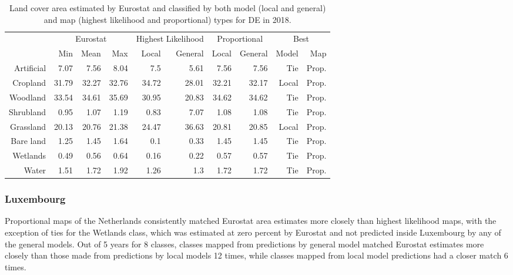     \begin{table}[H]
    \centering
    \caption{Land cover area estimated by Eurostat and classified by both model (local and general) and map (highest likelihood and proportional) types for DE in 2018.}
    
    \begin{tabular}{r|rrr|rr|rr|rr}
    \toprule
    {} & \multicolumn{3}{|c}{Eurostat} & \multicolumn{2}{|c}{Highest Likelihood} & \multicolumn{2}{|c}{Proportional} & \multicolumn{2}{|c}{Best} \\
    {} &      Min &   Mean &    Max &              Local & General &        Local & General &  Model &    Map \\
    \midrule
    Artificial &     7.07 &   7.56 &   8.04 &                7.5 &    5.61 &         7.56 &    7.56 &    Tie &  Prop. \\
    Cropland   &    31.79 &  32.27 &  32.76 &              34.72 &   28.01 &        32.21 &   32.17 &  Local &  Prop. \\
    Woodland   &    33.54 &  34.61 &  35.69 &              30.95 &   20.83 &        34.62 &   34.62 &    Tie &  Prop. \\
    Shrubland  &     0.95 &   1.07 &   1.19 &               0.83 &    7.07 &         1.08 &    1.08 &    Tie &  Prop. \\
    Grassland  &    20.13 &  20.76 &  21.38 &              24.47 &   36.63 &        20.81 &   20.85 &  Local &  Prop. \\
    Bare land  &     1.25 &   1.45 &   1.64 &                0.1 &    0.33 &         1.45 &    1.45 &    Tie &  Prop. \\
    Wetlands   &     0.49 &   0.56 &   0.64 &               0.16 &    0.22 &         0.57 &    0.57 &    Tie &  Prop. \\
    Water      &     1.51 &   1.72 &   1.92 &               1.26 &     1.3 &         1.72 &    1.72 &    Tie &  Prop. \\
    \bottomrule
    \end{tabular}
    \end{table}
    
    \subsubsection{Luxembourg}
    Proportional maps of the Netherlands consistently matched Eurostat area estimates more closely than highest likelihood maps, with the exception of ties for the Wetlands class, which was estimated at zero percent by Eurostat and not predicted inside Luxembourg by any of the general models. Out of 5 years for 8 classes, classes mapped from predictions by general model matched Eurostat estimates more closely than those made from predictions by local models 12 times, while classes mapped from local model predictions had a closer match 6 times.
    

